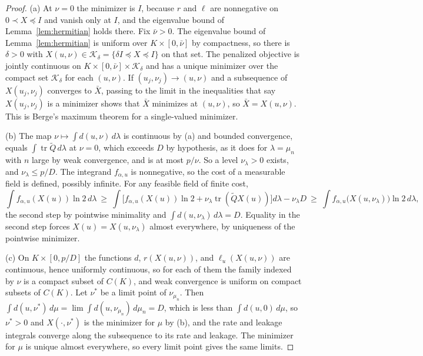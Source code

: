 \documentclass[11pt,onecolumn]{IEEEtran}
\newcommand{\tr}{\operatorname{tr}}
\newcommand{\tQ}{\tilde Q}
\begin{document}
\begin{proof}
(a) At $\nu=0$ the minimizer is $I$, because $r$ and $\ell$ are
nonnegative on $0\prec X\preceq I$ and vanish only at $I$, and the
eigenvalue bound of Lemma~\ref{lem:hermitian} holds there. Fix
$\bar\nu>0$. The eigenvalue bound of Lemma~\ref{lem:hermitian} is
uniform over $K\times[0,\bar\nu]$ by compactness, so there is $\delta>0$
with $X(u,\nu)\in\mathcal K_\delta=\{\delta I\preceq X\preceq I\}$ on that
set. The penalized objective is jointly continuous on
$K\times[0,\bar\nu]\times\mathcal K_\delta$ and has a unique minimizer
over the compact set $\mathcal K_\delta$ for each $(u,\nu)$. If
$(u_j,\nu_j)\to(u,\nu)$ and a subsequence of $X(u_j,\nu_j)$ converges to
$\bar X$, passing to the limit in the inequalities that say
$X(u_j,\nu_j)$ is a minimizer shows that $\bar X$ minimizes at $(u,\nu)$,
so $\bar X=X(u,\nu)$. This is Berge's maximum theorem
\cite[Ch.~VI, \S3]{berge1963} for a single-valued minimizer.

(b) The map $\nu\mapsto\int d(u,\nu)\,d\lambda$ is continuous by (a) and
bounded convergence, equals $\int\tr\tQ\,d\lambda$ at $\nu=0$, which
exceeds $D$ by hypothesis, as it does for $\lambda=\mu_n$ with $n$ large by
weak convergence, and is at most $p/\nu$. So a level $\nu_\lambda>0$
exists, and $\nu_\lambda\le p/D$. The integrand $f_{\alpha,u}$ is
nonnegative, so the cost of a measurable field is defined, possibly
infinite. For any feasible field of finite cost,
\[
\int f_{\alpha,u}(X(u))\ln2\,d\lambda\ \ge\ \int\bigl[f_{\alpha,u}(X(u))\ln2+\nu_\lambda\tr(\tQ X(u))\bigr]d\lambda-\nu_\lambda D
\ \ge\ \int f_{\alpha,u}\bigl(X(u,\nu_\lambda)\bigr)\ln2\,d\lambda ,
\]
the second step by pointwise minimality and
$\int d(u,\nu_\lambda)\,d\lambda=D$. Equality in the second step forces
$X(u)=X(u,\nu_\lambda)$ almost everywhere, by uniqueness of the pointwise
minimizer.

(c) On $K\times[0,p/D]$ the functions $d$,
$r(X(u,\nu))$, and $\ell_u(X(u,\nu))$ are continuous, hence uniformly
continuous, so for each of them the family indexed by $\nu$ is a
compact subset of $C(K)$, and weak convergence is uniform on compact
subsets of $C(K)$. Let $\nu^\ast$ be a limit point of $\nu_{\mu_n}$. Then
$\int d(u,\nu^\ast)\,d\mu=\lim\int d(u,\nu_{\mu_n})\,d\mu_n=D$, which is
less than $\int d(u,0)\,d\mu$, so $\nu^\ast>0$ and
$X(\cdot,\nu^\ast)$ is the minimizer for $\mu$ by (b), and the rate and
leakage integrals converge along the subsequence to its rate and
leakage. The minimizer for $\mu$ is unique almost everywhere, so every
limit point gives the same limits.
\end{proof}
\end{document}
